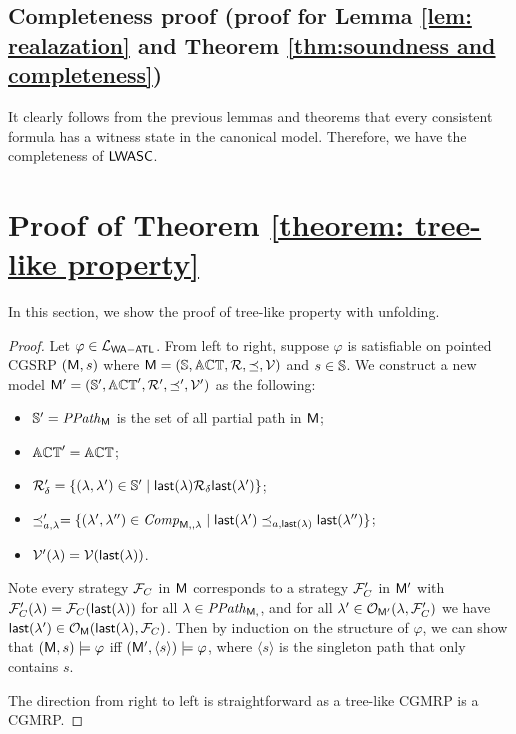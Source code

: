 \subsection{Completeness proof (proof for Lemma \ref{lem: realazation} and Theorem \ref{thm:soundness and completeness})}\label{sec: completeness proof}\label{sec:app:completeness_proof}
It clearly follows from the previous lemmas and theorems that every consistent formula has a witness state in the canonical model. Therefore, we have the completeness of $\mathsf{LWASC}$.



\section{Proof of  Theorem \ref{theorem: tree-like property} }\label{sec: proof of tree-like property}\label{sec:app:tree_like}
In this section, we show the proof of tree-like property with unfolding. 
\begin{proof}
Let $\varphi \in \mathcal{L}_{\mathsf{WA{-}ATL}} $. From left to right, suppose $\varphi $ is satisfiable on pointed CGSRP $(\mathsf{M},s)$ where $\mathsf{M}=(\mathbb{S},  \mathbb{ACT},  \mathcal{R}, \preceq, \mathcal{V})$ and $s\in \mathbb{S}$. We construct a new model $\mathsf{M}'=(\mathbb{S}',  \mathbb{ACT}',  \mathcal{R}', \preceq', \mathcal{V}')$ as the following:
\begin{itemize}
  \item $\mathbb{S}' = \mathit{PPath}_{\mathsf{M}}$ is the set of all partial path in $\mathsf{M}$;
  \item $\mathbb{ACT}' = \mathbb{ACT}$;
  \item $\mathcal{R}'_\delta = \{(\lambda, \lambda')\in \mathbb{S}'\mid \mathsf{last}(\lambda)\mathcal{R}_\delta \mathsf{last}(\lambda')\}$;
  \item $\preceq'_{a,\lambda} = \{(\lambda',\lambda'')\in \mathit{Comp}_{\mathsf{M},,\lambda}\mid \mathsf{last}(\lambda')\preceq_{a,\mathsf{last}(\lambda)} \mathsf{last}(\lambda'')\}$;
  \item $\mathcal{V}'(\lambda) = \mathcal{V}(\mathsf{last}(\lambda))$.
  \end{itemize}
  Note every strategy $\mathcal{F}_C$ in $\mathsf{M}$ corresponds to a strategy $\mathcal{F}'_C$ in $\mathsf{M}'$ with $\mathcal{F}'_C(\lambda) = \mathcal{F}_C(\mathsf{last}(\lambda))$ for all $\lambda \in \mathit{PPath}_{\mathsf{M},}$, and for all $\lambda' \in \mathcal{O}_{\mathsf{M}'}(\lambda,\mathcal{F}'_C)$ we have $\mathsf{last}(\lambda')\in \mathcal{O}_{\mathsf{M}}(\mathsf{last}(\lambda),\mathcal{F}_C)$. 
  Then by induction on the structure of $\varphi$, we can show that $(\mathsf{M},s)\models \varphi $ iff $(\mathsf{M}',\langle s\rangle)\models \varphi $, where $\langle s\rangle$ is the singleton path that only contains $s$. 

  The direction from right to left is straightforward as a tree-like CGMRP is a CGMRP.
\end{proof}

